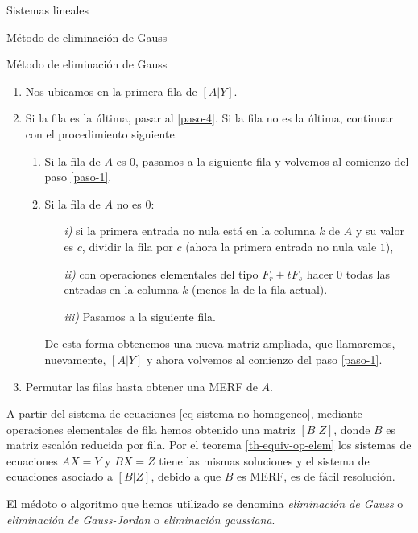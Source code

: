 \begin{chapter}{Sistemas lineales}
\begin{section}{Método de eliminación de Gauss }
\begin{subsection}{Método de eliminación de Gauss}
                \begin{enumerate}
                    \item \label{paso-0} Nos ubicamos en la primera fila de $[A|Y]$.
                    \item \label{paso-1}  Si la fila es la última, pasar al \ref{paso-4}. Si la fila no es la última, continuar con el procedimiento siguiente. 
                    \begin{enumerate}
                        \item \label{paso-1.1}  Si la fila de $A$ es $0$, pasamos a la siguiente fila y volvemos al comienzo del paso \ref{paso-1}.
                        \item \label{paso-1.2} Si la fila de $A$  no es $0$: 
                        \begin{enumerate}
                            \item[\textit{i)}] si la primera entrada no nula está en  la columna $k$ de $A$ y su valor es $c$, dividir la fila por $c$ (ahora la primera entrada no nula vale $1$),
                            \item[\textit{ii)}] con operaciones elementales del tipo $F_r+ tF_s$ hacer $0$  todas las entradas en la columna $k$ (menos la de la fila actual). 
                            \item[\textit{iii)}] Pasamos a la siguiente fila.
                        \end{enumerate}
                        De esta forma obtenemos una nueva matriz ampliada,  que llamaremos, nuevamente, $[A|Y]$ y ahora volvemos al comienzo del paso \ref{paso-1}. 
                    \end{enumerate}
                    \item \label{paso-4} Permutar las filas hasta obtener una MERF de $A$. 
                \end{enumerate}
 
                A partir del sistema de ecuaciones \eqref{eq-sistema-no-homogeneo}, mediante operaciones elementales de fila hemos obtenido  una matriz $[B|Z]$, donde $B$ es matriz escalón reducida por fila. Por el teorema \ref{th-equiv-op-elem} los sistemas de ecuaciones $AX=Y$ y $BX=Z$ tiene las mismas soluciones y el sistema de ecuaciones asociado a $[B|Z]$,  debido a que $B$  es MERF, es de fácil resolución.  
                
                El médoto o  algoritmo que hemos utilizado se denomina \textit{eliminación de Gauss} o \textit{eliminación de Gauss-Jordan} o \textit{eliminación gaussiana}. 


\end{subsection}
\end{section}
\end{chapter}

